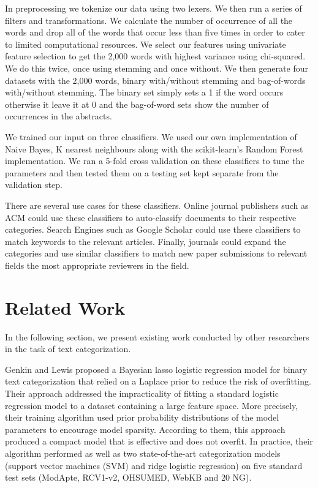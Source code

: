 \documentclass{acm_proc_article-sp}
\begin{document}
In preprocessing we tokenize our data using two lexers. We then run a series of filters and transformations. We calculate the number of occurrence of all the words and drop all of the words that occur less than five times in order to cater to limited computational resources. We select our features using univariate feature selection to get the 2,000 words with highest variance using chi-squared. We do this twice, once using stemming and once without. We then generate four datasets with the 2,000 words, binary with/without stemming and bag-of-words with/without stemming. The binary set simply sets a 1 if the word occurs otherwise it leave it at 0 and the bag-of-word sets show the number of occurrences in the abstracts. 

We trained our input on three classifiers. We used our own implementation of Naive Bayes, K nearest neighbours along with the scikit-learn's Random Forest implementation. We ran a 5-fold cross validation on these classifiers to tune the parameters and then tested them on a testing set kept separate from the validation step. 

There are several use cases for these classifiers. Online journal publishers such as ACM could use these classifiers to auto-classify documents to their respective categories. Search Engines such as Google Scholar could use these classifiers to match keywords to the relevant articles. Finally, journals could expand the categories and use similar classifiers to match new paper submissions to relevant fields the most appropriate reviewers in the field. 







\section{Related Work}
In the following section, we present existing work conducted by other researchers in the task of text categorization.

Genkin and Lewis \cite{citeulike:1472197} proposed a Bayesian lasso logistic regression model for binary text categorization that relied on a Laplace prior to reduce the risk of overfitting. Their approach addressed the impracticality of fitting a standard logistic regression model to a dataset containing a large feature space. More precisely, their training algorithm used prior probability distributions of the model parameters to encourage model sparsity. According to them, this approach produced a compact model that is effective and does not overfit. In practice, their algorithm performed as well as two state-of-the-art categorization models (support vector machines (SVM) and ridge logistic regression) on five standard test sets (ModApte, RCV1-v2, OHSUMED, WebKB and 20 NG). 
\end{document}
